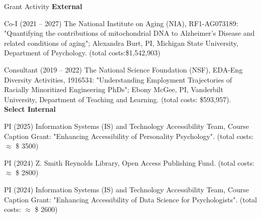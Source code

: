 \begin{rSection}{\textrm{Grant Activity}}%
{\large \textbf{External}}%
\begin{etaremune}
\item Co-I (2021 – 2027) The National Institute on Aging (NIA), RF1-AG073189: "Quantifying the contributions of mitochondrial DNA to Alzheimer's Disease and related conditions of aging"; Alexandra Burt, PI, Michigan State University, Department of Psychology. (total costs:\$1,542,903)%

\item Consultant (2019 – 2022) The National Science Foundation (NSF), EDA-Eng Diversity Activities, 1916534: "Understanding Employment Trajectories of Racially Minoritized Engineering PhDs"; Ebony McGee, PI, Vanderbilt University, Department of Teaching and Learning. (total costs: \$593,957).
\smallskip\\
\hspace*{-8mm}\large{\bf{Select Internal}}%
\item PI (2025) Information Systems (IS) and Technology Accessibility Team, Course Caption Grant: "Enhancing Accessibility of Personality Psychology". (total costs: $\approx$ \$ 3500)%
\item PI (2024) Z. Smith Reynolds Library, Open Access Publishing Fund. (total costs: $\approx$ \$ 2800) %
\item PI (2024) Information Systems (IS) and Technology Accessibility Team, Course Caption Grant: "Enhancing Accessibility of Data Science for Psychologists". (total costs: $\approx$ \$ 2600)%
\end{etaremune}
\end{rSection}